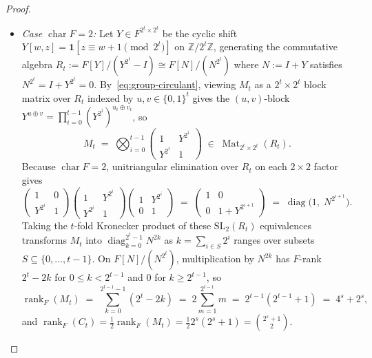 \documentclass[11pt,reqno]{amsart}
\theoremstyle{definition}
\theoremstyle{remark}
\DeclareMathOperator{\rk}{rank}
\DeclareMathOperator{\diag}{diag}
\newcommand{\ZZ}{\mathbb{Z}}
\newcommand{\ind}{\mathbf{1}}
\numberwithin{equation}{section}
\begin{document}
\begin{proof}
\begin{itemize}[leftmargin=2em]
  \item \emph{Case $\operatorname{char} F = 2$:} Let $Y \in F^{2^t \times 2^t}$ be the cyclic shift $Y[w, z] = \ind[z \equiv w + 1 \pmod{2^t}]$ on $\ZZ/2^t\ZZ$, generating the commutative algebra $R_t := F[Y]/(Y^{2^t} - I) \cong F[N]/(N^{2^t})$ where $N := I + Y$ satisfies $N^{2^t} = I + Y^{2^t} = 0$. By~\eqref{eq:group-circulant}, viewing $M_t$ as a $2^t \times 2^t$ block matrix over $R_t$ indexed by $u, v \in \{0, 1\}^t$ gives the $(u, v)$-block $Y^{u \oplus v} = \prod_{i=0}^{t-1} (Y^{2^i})^{u_i \oplus v_i}$, so
  \[
    M_t \;=\; \bigotimes_{i=0}^{t-1} \begin{pmatrix} 1 & Y^{2^i} \\ Y^{2^i} & 1 \end{pmatrix} \;\in\; \operatorname{Mat}_{2^t \times 2^t}(R_t).
  \]
  Because $\operatorname{char} F = 2$, unitriangular elimination over $R_t$ on each $2 \times 2$ factor gives
  \[
    \begin{pmatrix} 1 & 0 \\ Y^{2^i} & 1 \end{pmatrix}
    \begin{pmatrix} 1 & Y^{2^i} \\ Y^{2^i} & 1 \end{pmatrix}
    \begin{pmatrix} 1 & Y^{2^i} \\ 0 & 1 \end{pmatrix}
    \;=\; \begin{pmatrix} 1 & 0 \\ 0 & 1 + Y^{2^{i+1}} \end{pmatrix}
    \;=\; \diag\bigl(1,\; N^{2^{i+1}}\bigr).
  \]
  Taking the $t$-fold Kronecker product of these $\mathrm{SL}_2(R_t)$ equivalences transforms $M_t$ into $\diag_{k=0}^{2^t-1} N^{2k}$ as $k = \sum_{i \in S} 2^i$ ranges over subsets $S \subseteq \{0, \dots, t - 1\}$. On $F[N]/(N^{2^t})$, multiplication by $N^{2k}$ has $F$-rank $2^t - 2k$ for $0 \le k < 2^{t-1}$ and $0$ for $k \ge 2^{t-1}$, so
  \[
    \rk_F(M_t) \;=\; \sum_{k=0}^{2^{t-1}-1} (2^t - 2k) \;=\; 2 \sum_{m=1}^{2^{t-1}} m \;=\; 2^{t-1}(2^{t-1} + 1) \;=\; 4^s + 2^s,
  \]
  and $\rk_F(C_t) = \frac{1}{2}\rk_F(M_t) = \frac{1}{2}2^s(2^s + 1) = \binom{2^s + 1}{2}$.
\end{itemize}


\end{proof}
\end{document}

